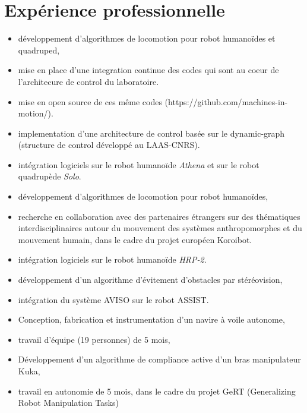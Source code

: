 \documentclass[11pt,a4paper,sans]{moderncv}        %
\newcommand{\items}{\item \hspace{2mm}}
\begin{document}
\section{Exp\'erience professionnelle}
{
  \begin{itemize}%
    \items d\'eveloppement d'algorithmes de locomotion pour robot humano\"ides
    et quadruped,
    \items mise en place d'une integration continue des codes qui sont au coeur
    de l'architecure de control du laboratoire.
    \items mise en open source de ces m\^eme codes
    (https://github.com/machines-in-motion/).
    \items implementation d'une architecture de control bas\'ee sur le 
    dynamic-graph (structure de control d\'evelopp\'e au LAAS-CNRS).
    \items int\'egration logiciels sur le robot humano\"ide \emph{Athena} et
    sur le robot quadrup\`ede \emph{Solo}.
  \end{itemize}
}
{
  \begin{itemize}%
    \items d\'eveloppement d'algorithmes de locomotion pour robot humano\"ides,
    \items recherche en collaboration avec des partenaires \'etrangers sur des
    th\'ematiques interdisciplinaires autour du mouvement des syst\`emes
    anthropomorphes et du mouvement humain, dans le cadre du projet europ\'een
    Koroibot.
    \items int\'egration logiciels sur le robot humano\"ide \emph{HRP-2}.
  \end{itemize}
}
%
%
{
  \begin{itemize}%
    \items d\'eveloppement d'un algorithme d'\'evitement d'obstacles par st\'er\'eovision,
    \items int\'egration du syst\`eme AVISO sur le robot ASSIST.
  \end{itemize}
}
%
%
{
  \begin{itemize}%
    \items Conception, fabrication et instrumentation d'un navire \`a voile autonome,
    \items travail d'\'equipe (19 personnes) de 5 mois,
  \end{itemize}
}
%
%
%
{
  \begin{itemize}%
    \items D\'eveloppement d'un algorithme de compliance active d'un bras manipulateur Kuka,
    \items travail en autonomie de 5 mois, dans le cadre du projet GeRT (Generalizing Robot Manipulation Tasks)
  \end{itemize}
}
\end{document}
